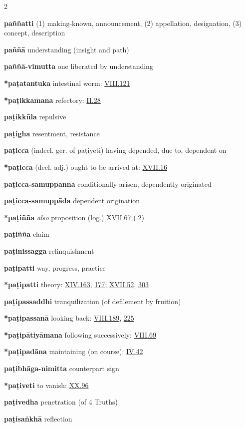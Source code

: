 \begin{multicols}{2}
\begin{vismHanging}
\par\textbf{paññatti} (1) making-known, announcement, (2) appellation, designation, (3) concept, description 
\par\textbf{paññā} understanding (insight and path)
\par\textbf{paññā-vimutta} one liberated by understanding 
\par\textbf{*paṭatantuka} intestinal worm: \hyperlink{VIII.121}{VIII.121}{} 
\par\textbf{*paṭikkamana} refectory: \hyperlink{II.28}{II.28}{} 
\par\textbf{paṭikkūla} repulsive
\par\textbf{paṭigha} resentment, resistance
\par\textbf{paṭicca} (indecl. ger. of paṭiyeti) having depended, due to, dependent on 
\par\textbf{*paṭicca} (decl. adj.) ought to be arrived at: \hyperlink{XVII.16}{XVII.16}{} 
\par\textbf{paṭicca-samuppanna} conditionally arisen, dependently originated 
\par\textbf{paṭicca-samuppāda} dependent origination 
\par\textbf{*paṭiñña} \emph{also }proposition (log.) \hyperlink{XVII.67}{XVII.67}{} (\textbf{\cite{Kv}}.2) 
\par\textbf{paṭiñña} claim 
\par\textbf{paṭinissagga} relinquishment 
\par\textbf{paṭipatti} way, progress, practice
\par\textbf{*paṭipatti} theory: \hyperlink{XIV.163}{XIV.163}{}, \hyperlink{XIV.177}{177}{}; \hyperlink{XVII.52}{XVII.52}{}, \hyperlink{XVII.303}{303}{} 
\par\textbf{paṭipassaddhi} tranquilization (of defilement by fruition) 
\par\textbf{*paṭipassanā} looking back: \hyperlink{VIII.189}{VIII.189}{}, \hyperlink{VIII.225}{225}{} 
\par\textbf{*paṭipātiyāmana} following successively: \hyperlink{VIII.69}{VIII.69}{} 
\par\textbf{*paṭipadāna} maintaining (on course): \hyperlink{IV.42}{IV.42}{} 
\par\textbf{paṭibhāga-nimitta} counterpart sign
\par\textbf{*paṭiveti} to vanish: \hyperlink{XX.96}{XX.96}{}
\par\textbf{paṭivedha} penetration (of 4 Truths)
\par\textbf{paṭisaṅkhā} reflection

\end{vismHanging}
\end{multicols}
